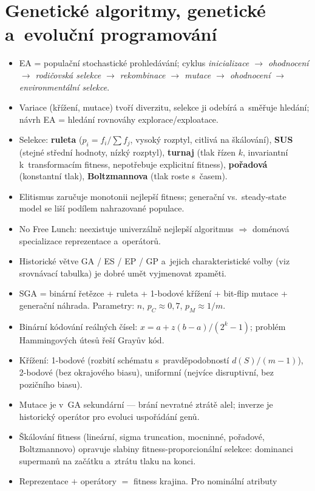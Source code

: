 \documentclass[11pt,a4paper]{article}
\theoremstyle{definition}
\begin{document}
\section{Genetické algoritmy, genetické a~evoluční programování}
\begin{itemize}
\item EA = populační stochastické prohledávání; cyklus \emph{inicializace $\to$
 ohodnocení $\to$ rodičovská selekce $\to$ rekombinace $\to$ mutace $\to$
 ohodnocení $\to$ environmentální selekce}.
\item Variace (křížení, mutace) tvoří diverzitu, selekce ji odebírá a~směřuje
 hledání; návrh EA = hledání rovnováhy explorace/exploatace.
\item Selekce: \textbf{ruleta} ($p_i = f_i/\sum f_j$, vysoký rozptyl, citlivá na
 škálování), \textbf{SUS} (stejné střední hodnoty, nízký rozptyl),
 \textbf{turnaj} (tlak řízen $k$, invariantní k~transformacím fitness, nepotřebuje
 explicitní fitness), \textbf{pořadová} (konstantní tlak),
 \textbf{Boltzmannova} (tlak roste s~časem).
\item Elitismus zaručuje monotonii nejlepší fitness; generační vs.\ steady-state
 model se liší podílem nahrazované populace.
\item No Free Lunch: neexistuje univerzálně nejlepší algoritmus $\Rightarrow$
 doménová specializace reprezentace a~operátorů.
\item Historické větve GA / ES / EP / GP a~jejich charakteristické volby
 (viz srovnávací tabulka) je dobré umět vyjmenovat zpaměti.
\item SGA = binární řetězce + ruleta + 1-bodové křížení + bit-flip mutace
 + generační náhrada. Parametry: $n$, $p_C \approx 0{,}7$, $p_M \approx 1/m$.
\item Binární kódování reálných čísel: $x = a + z(b-a)/(2^k-1)$; problém
 Hammingových útesů řeší Grayův kód.
\item Křížení: 1-bodové (rozbití schématu s~pravděpodobností $d(S)/(m-1)$),
 2-bodové (bez okrajového biasu), uniformní (nejvíce disruptivní, bez
 pozičního biasu).
\item Mutace je v~GA sekundární --- brání nevratné ztrátě alel; inverze je
 historický operátor pro evoluci uspořádání genů.
\item Škálování fitness (lineární, sigma truncation, mocninné, pořadové,
 Boltzmannovo) opravuje slabiny fitness-proporcionální selekce: dominanci
 supermanů na začátku a~ztrátu tlaku na konci.
\item Reprezentace $+$ operátory $=$ fitness krajina. Pro nominální atributy

\end{itemize}
\end{document}
